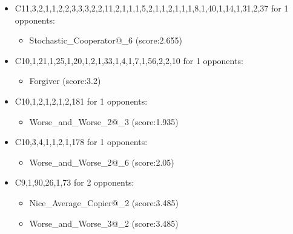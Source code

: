\begin{appendices}
\begin{itemize}
        \item C11,3,2,1,1,2,2,3,3,3,2,2,11,2,1,1,1,5,2,1,1,2,1,1,1,8,1,40,1,14,1,31,2,37 for 1 opponents:
        \begin{multicols}{3}
            \begin{itemize}
                \item Stochastic\_Cooperator@\_6 (score:2.655)
            \end{itemize}
        \end{multicols}

        \item C10,1,21,1,25,1,20,1,2,1,33,1,4,1,7,1,56,2,2,10 for 1 opponents:
        \begin{multicols}{3}
            \begin{itemize}
                \item Forgiver (score:3.2)
            \end{itemize}
        \end{multicols}

        \item C10,1,2,1,2,1,2,181 for 1 opponents:
        \begin{multicols}{3}
            \begin{itemize}
                \item Worse\_and\_Worse\_2@\_3 (score:1.935)
            \end{itemize}
        \end{multicols}

        \item C10,3,4,1,1,2,1,178 for 1 opponents:
        \begin{multicols}{3}
            \begin{itemize}
                \item Worse\_and\_Worse\_2@\_6 (score:2.05)
            \end{itemize}
        \end{multicols}

        \item C9,1,90,26,1,73 for 2 opponents:
        \begin{multicols}{3}
            \begin{itemize}
                \item Nice\_Average\_Copier@\_2 (score:3.485)
                \item Worse\_and\_Worse\_3@\_2 (score:3.485)
            \end{itemize}
        \end{multicols}


\end{itemize}
\end{appendices}

